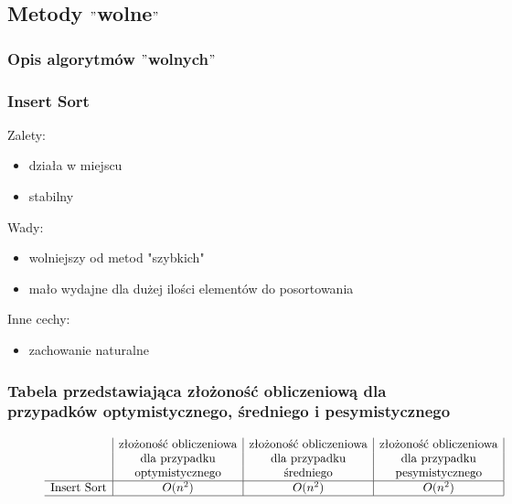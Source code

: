 \documentclass[polish,polish,a4paper]{article}
\begin{document}
\begin{spacing}{1.5}
	\subsection{Metody $ "$wolne$" $}
	\subsubsection{Opis algorytmów $"$wolnych$"$}
	\subsubsection*{Insert Sort}
	Zalety:
	\begin{itemize}
		\item działa w miejscu
		\item stabilny 
	\end{itemize}
	Wady:
	\begin{itemize}
		\item wolniejszy od metod "szybkich"
		\item mało wydajne dla dużej ilości elementów do posortowania
	\end{itemize}
	Inne cechy:
	\begin{itemize}
		\item zachowanie naturalne
	\end{itemize}
	
				\subsubsection*{Tabela przedstawiająca złożoność obliczeniową dla przypadków optymistycznego, średniego i pesymistycznego} 
	
	\begin{figure}[H]
		\begin{equation*}
		\begin{array}{l|c|c|c|}

		&$złożoność obliczeniowa$&$złożoność obliczeniowa$&$złożoność obliczeniowa$\\
		&$dla przypadku$&$dla przypadku$&$dla przypadku$\\
		&$optymistycznego$&$średniego$&$pesymistycznego$\\
		\hline
		$Insert Sort$&O(n^2)&O(n^2)&O(n^2)\\
		\hline
		\end{array}
		\end{equation*}
	\end{figure}
		

\end{spacing}
\end{document}
